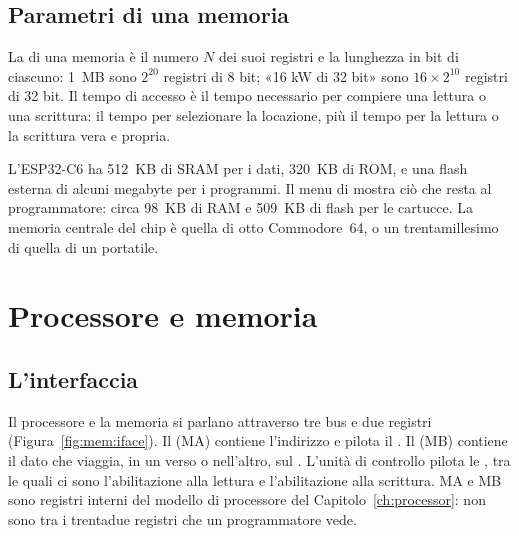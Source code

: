 
\subsection{Parametri di una memoria}

La  di una memoria è il numero $N$ dei suoi registri e la
lunghezza in bit di ciascuno: 1~MB sono $2^{20}$ registri di 8 bit; «16 kW di
32 bit» sono $16\times 2^{10}$ registri di 32 bit. Il tempo di accesso è il
tempo necessario per compiere una lettura o una scrittura: il tempo per
selezionare la locazione, più il tempo per la lettura o la scrittura vera e
propria.

\begin{prgmachine}
L'ESP32-C6 ha 512~KB di SRAM per i dati, 320~KB di ROM, e una flash esterna di
alcuni megabyte per i programmi. Il menu di \prg mostra ciò che resta al
programmatore: circa 98~KB di RAM e 509~KB di flash per le cartucce. La memoria
centrale del chip è quella di otto Commodore~64, o un trentamillesimo di quella
di un portatile.
\end{prgmachine}

\section{Processore e memoria}

\subsection{L'interfaccia}

Il processore e la memoria si parlano attraverso tre bus e due registri
(Figura~\ref{fig:mem:iface}). Il  (MA)
contiene l'indirizzo e pilota il . Il  (MB) contiene il dato che viaggia, in un verso o
nell'altro, sul . L'unità di controllo pilota le , tra le quali ci sono l'abilitazione alla lettura e l'abilitazione
alla scrittura. MA e MB sono registri interni del modello di processore del
Capitolo~\ref{ch:processor}: non sono tra i trentadue registri che un
programmatore \riscv vede.

